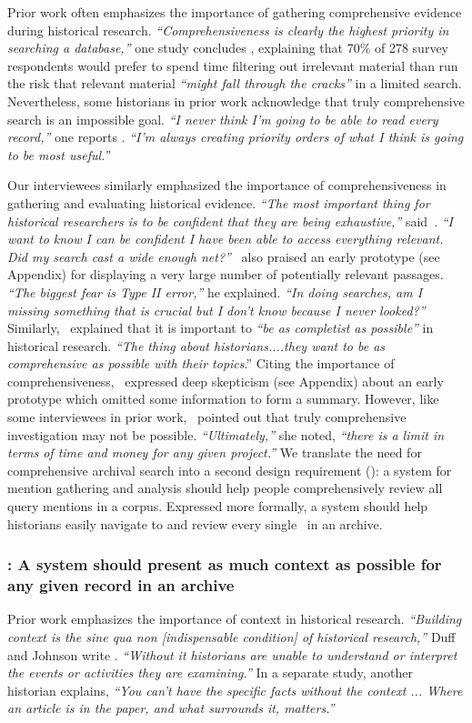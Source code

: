 Prior work often emphasizes the importance of gathering comprehensive evidence during historical research.  \textit{``Comprehensiveness is clearly the highest priority in searching a database,''} one study concludes \cite{DaltonCharnigo}, explaining that 70\% of 278 survey respondents would prefer to spend time filtering out irrelevant material than run the risk that relevant material \textit{``might fall through the cracks''} in a limited search. Nevertheless, some historians in prior work acknowledge that truly comprehensive search is an impossible goal. \textit{``I never think I'm going to be able to read every record,''} one reports \cite{DuffJohnson}. \textit{``I'm always creating priority orders of what I think is going to be most useful.''}


Our interviewees similarly emphasized the importance of comprehensiveness in gathering and evaluating historical evidence. \textit{``The most important thing for historical researchers is to be confident that they are being exhaustive,''} said~\ifour. \textit{``I want to know I can be confident I have been able to access everything relevant. Did my search cast a wide enough net?''} \ifour~also praised an early prototype (see Appendix) for displaying a very large number of potentially relevant passages. \textit{``The biggest fear is Type II error,''} he explained. \textit{``In doing searches, am I missing something that is crucial but I don’t know because I never looked?''}
Similarly, \ifive~explained that it is important to \textit{``be as completist as possible''} in historical research. 
\textit{``The thing about historians....they want to be as comprehensive as possible with their topics}.'' Citing the importance of comprehensiveness, \ifive~expressed deep skepticism (see Appendix) about an early prototype which omitted some information to form a summary.
However, like some interviewees in prior work, \itwo~pointed out that truly comprehensive investigation may not be possible. \textit{``Ultimately,''} she noted, \textit{``there is a limit in terms of time and money for any given project.''}
We translate the need for comprehensive archival search into a second design requirement {(\rcomprehensive): a system for mention gathering and analysis should help people comprehensively review all query mentions in a corpus.}
Expressed more formally, a system should help historians easily navigate to and review every single \specificmention~in an archive.

\subsubsection{\textbf{\rcontext: A system should present as much context as possible for any given record in an archive}}\label{s:needs_context}
Prior work emphasizes the importance of context in historical research. \textit{``Building context is the {\normalfont sine qua non [indispensable condition]} of historical research,''} Duff and Johnson write \cite{DuffJohnson}. \textit{``Without it historians are unable to understand or interpret the events or activities they are examining.''} 
In a separate study, another historian explains, \textit{``You can't have the specific facts without the context ... Where an article is in the paper, and what surrounds it, matters.''} 

